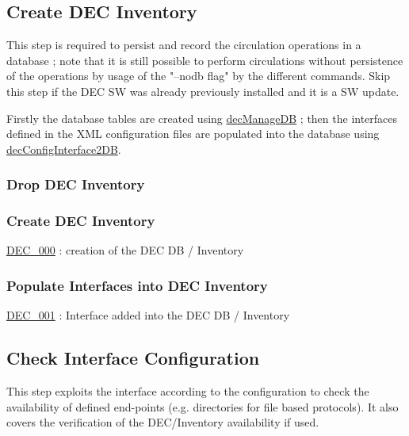 \documentclass[dec_sum_main.tex]{subfiles}
\begin{document}
\subsection{Create DEC Inventory}
This step is required to persist and record the circulation operations in a database ; note that it is still possible to perform circulations without persistence of the operations by usage of the "--nodb flag" by the different commands. Skip this step if the DEC SW was already previously installed and it is a SW update.\newline

\par 
\noindent
Firstly the database tables are created using \hyperref[decManageDB]{decManageDB} ; then the interfaces defined in the XML configuration files are populated into the database using \hyperref[decConfigInterface2DB]{decConfigInterface2DB}.

\subsubsection{Drop DEC Inventory}
 \newline

\subsubsection{Create DEC Inventory}
 \newline

\noindent
\hyperref[DEC000]{DEC\_000} : creation of the DEC DB / Inventory

\subsubsection{Populate Interfaces into DEC Inventory}
 \newline

\noindent
\hyperref[DEC001]{DEC\_001} : Interface added into the DEC DB / Inventory

\subsection{Check Interface Configuration}
This step exploits the interface according to the configuration to check the availability of defined end-points (e.g. directories for file based protocols). It also covers the verification of the DEC/Inventory availability if used.
\end{document}
